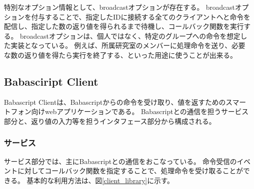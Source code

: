 \documentclass[twoside]{wiss}
\begin{document}


特別なオプション情報として、broadcastオプションが存在する。
broadcastオプションを付与することで、指定したIDに接続する全てのクライアントへと命令を配信し、指定した数の返り値を得られるまで待機し、コールバック関数を実行する。
broadcastオプションは、個人ではなく、特定のグループへの命令を想定した実装となっている。
例えば、所属研究室のメンバーに処理命令を送り、必要な数の返り値を得たら実行を終了する、といった用途に使うことが出来る。

\subsection{Babasciript Client}

Babascript Clientは、Babascriptからの命令を受け取り、値を返すためのスマートフォン向けwebアプリケーションである。
Babascriptとの通信を担うサービス部分と、返り値の入力等を担うインタフェース部分から構成される。

\subsubsection{サービス}
サービス部分では、主にBabascriptとの通信をおこなっている。
命令受信のイベントに対してコールバック関数を指定することで、処理命令を受け取ることができる。
基本的な利用方法は、図\ref{client_library}に示す。
\end{document}
